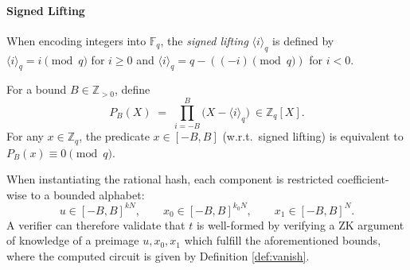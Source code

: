 \paragraph{Signed Lifting} When encoding integers into $\mathbb{F}_q$,  the \emph{signed lifting} $\langle i\rangle_q$ is defined by
$\langle i\rangle_q = i \pmod q$ for $i\ge 0$ and $\langle i\rangle_q = q - ((-i)\pmod q)$ for $i<0$.


\begin{definition}\label{def:vanish}
For a bound $B\in\mathbb{Z}_{>0}$, define
\[
  P_B(X)\;=\;\prod_{i=-B}^{B}\bigl(X-\langle i\rangle_q\bigr)\ \in \mathbb{Z}_q[X].
\]
For any $x\in\mathbb{Z}_q$, the predicate $x\in[-B,B]$ (w.r.t.\ signed lifting) is equivalent to 
$P_B(x)\equiv 0\pmod q$.
\end{definition}

When instantiating the rational hash, each component is restricted coefficient-wise to a bounded alphabet:
\[u \in [-B,B]^{kN},\qquad x_0 \in [-B,B]^{k_0N},\qquad x_1 \in [-B,B]^{N}.\]
A verifier can therefore validate that $t$ is well-formed by verifying a ZK argument of knowledge of a preimage $u,x_0,x_1$ which fulfill the aforementioned bounds, where the computed circuit is given by Definition \ref{def:vanish}.

